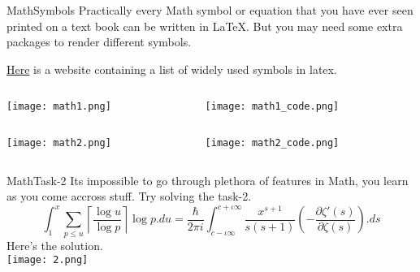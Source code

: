 \begin{frame}{Math}{Symbols}
	\footnotesize
	Practically every Math symbol
	or equation that you have ever seen printed on a text book can be
	written in \LaTeX. But you may need some extra packages to render different
	symbols. \vspace{1em}

	\href{https://oeis.org/wiki/List\_of\_LaTeX\_mathematical\_symbols}{Here} is a
	website containing a list of widely used symbols in latex.

	\begin{columns}
		\begin{column}{0.5\textwidth}
			\texttt{[image: math1.png]}
		\end{column}
		\begin{column}{0.5\textwidth}
			\texttt{[image: math1\_code.png]}
		\end{column}
	\end{columns}

	\begin{columns}
		\begin{column}{0.5\textwidth}
			\texttt{[image: math2.png]}
		\end{column}
		\begin{column}{0.5\textwidth}
			\texttt{[image: math2\_code.png]}
		\end{column}
	\end{columns}

\end{frame}


\begin{frame}{Math}{Task-2}
	Its impossible to go through plethora of features in Math, you learn
	as you come accross stuff.
    Try solving the task-2.
$$ \int_{1}^{x} \sum_{p\leq u}\left\lceil \frac{\log u}{\log p} \right\rceil \log p.du
= \frac{\hbar}{2\pi i}\int_{c-\iota \infty}^{c+\iota \infty}
\frac{x^{s+1}}{s(s+1)} \left( - \frac{\partial\zeta '(s)}{\partial\zeta(s)} \right).ds$$
\pause
Here's the solution.\\ \pause
\center
\texttt{[image: 2.png]}

\end{frame}

